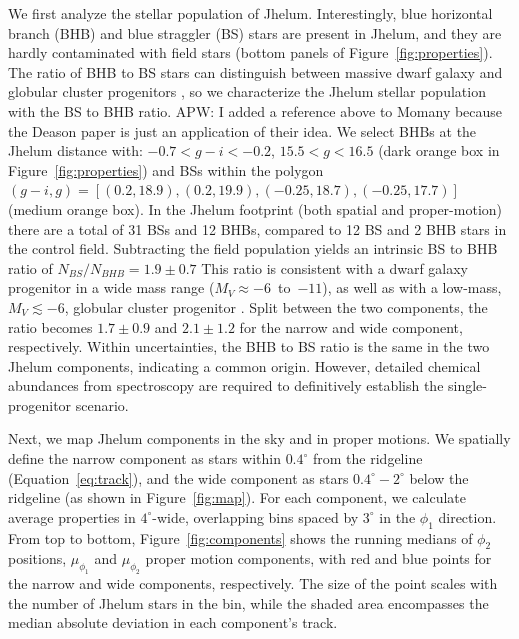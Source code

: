 \documentclass[twocolumn]{aastex62}
\newcommand{\apw}[1]{{\color{blue} APW: #1}}
\begin{document}
We first analyze the stellar population of Jhelum.
Interestingly, blue horizontal branch (BHB) and blue straggler (BS) stars are present in Jhelum, and they are hardly contaminated with field stars (bottom panels of Figure~\ref{fig:properties}).
The ratio of BHB to BS stars can distinguish between massive dwarf galaxy and globular cluster progenitors \citep[e.g.,][]{momany2007, deason2015}, so we characterize the Jhelum stellar population with the BS to BHB ratio.
\apw{I added a reference above to Momany because the Deason paper is just an application of their idea.}
We select BHBs at the Jhelum distance with: $-0.7<g-i<-0.2$, $15.5<g<16.5$ (dark orange box in Figure~\ref{fig:properties}) and BSs within the polygon $(g-i,g) = [(0.2,18.9), (0.2, 19.9), (-0.25, 18.7), (-0.25,17.7)]$ (medium orange box).
In the Jhelum footprint (both spatial and proper-motion) there are a total of 31 BSs and 12 BHBs, compared to 12 BS and 2 BHB stars in the control field.
Subtracting the field population yields an intrinsic BS to BHB ratio of $N_{BS} / N_{BHB} = 1.9\pm 0.7$
This ratio is consistent with a dwarf galaxy progenitor in a wide mass range ($M_V\approx-6$~to~$-11$), as well as with a low-mass, $M_V\lesssim-6$, globular cluster progenitor \citep{deason2015}.
Split between the two components, the ratio becomes $1.7\pm0.9$ and $2.1\pm1.2$ for the narrow and wide component, respectively.
Within uncertainties, the BHB to BS ratio is the same in the two Jhelum components, indicating a common origin.
However, detailed chemical abundances from spectroscopy are required to definitively establish the single-progenitor scenario.

Next, we map Jhelum components in the sky and in proper motions.
We spatially define the narrow component as stars within $0.4^\circ$ from the ridgeline (Equation~\ref{eq:track}), and the wide component as stars $0.4^\circ-2^\circ$ below the ridgeline (as shown in Figure~\ref{fig:map}).
For each component, we calculate average properties in $4^\circ$-wide, overlapping bins spaced by $3^\circ$ in the $\phi_1$ direction.
From top to bottom, Figure~\ref{fig:components} shows the running medians of $\phi_2$ positions, $\mu_{\phi_1}$ and $\mu_{\phi_2}$ proper motion components, with red and blue points for the narrow and wide components, respectively.
The size of the point scales with the number of Jhelum stars in the bin, while the shaded area encompasses the median absolute deviation in each component's track.
\end{document}
